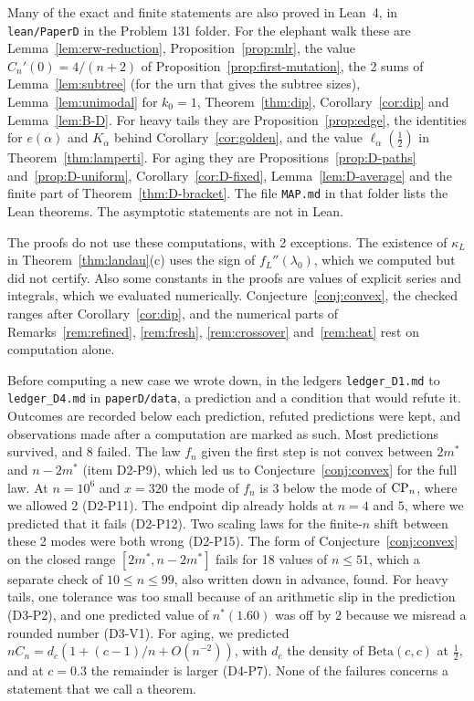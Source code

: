 Many of the exact and finite statements are also proved in Lean~4, in
\texttt{lean/PaperD} in the Problem 131 folder. For the elephant walk
these are Lemma~\ref{lem:erw-reduction}, Proposition~\ref{prop:mlr}, the
value $C_n'(0)=4/(n+2)$ of Proposition~\ref{prop:first-mutation}, the 2
sums of Lemma~\ref{lem:subtree} (for the urn that gives the subtree
sizes), Lemma~\ref{lem:unimodal} for $k_0=1$, Theorem~\ref{thm:dip},
Corollary~\ref{cor:dip} and Lemma~\ref{lem:B-D}. For heavy tails they are
Proposition~\ref{prop:edge}, the identities for $e(\alpha)$ and
$K_\alpha$ behind Corollary~\ref{cor:golden}, and the value
$\ell_\alpha(\frac12)$ in Theorem~\ref{thm:lamperti}. For aging they are
Propositions~\ref{prop:D-paths} and~\ref{prop:D-uniform},
Corollary~\ref{cor:D-fixed}, Lemma~\ref{lem:D-average} and the finite
part of Theorem~\ref{thm:D-bracket}. The file \texttt{MAP.md} in that
folder lists the Lean theorems. The asymptotic statements are not in
Lean.

The proofs do not use these computations, with 2 exceptions. The
existence of $\kappa_L$ in Theorem~\ref{thm:landau}(c) uses the sign of
$f_L''(\lambda_0)$, which we computed but did not certify. Also some
constants in the proofs are values of explicit series and integrals, which
we evaluated numerically. Conjecture~\ref{conj:convex}, the checked ranges
after Corollary~\ref{cor:dip}, and the numerical parts of
Remarks~\ref{rem:refined}, \ref{rem:fresh}, \ref{rem:crossover}
and~\ref{rem:heat} rest on computation alone.

Before computing a new case we wrote down, in the ledgers
\texttt{ledger\_D1.md} to \texttt{ledger\_D4.md} in \texttt{paperD/data},
a prediction and a condition that would refute it. Outcomes are recorded
below each prediction, refuted predictions were kept, and observations
made after a computation are marked as such. Most predictions survived,
and 8 failed. The law $f_n$ given the first step is not convex between
$2m^*$ and $n-2m^*$ (item D2-P9), which led us to
Conjecture~\ref{conj:convex} for the full law. At $n=10^6$ and $x=320$
the mode of $f_n$ is 3 below the mode of $\mathrm{CP}_n$, where we allowed 2
(D2-P11). The endpoint dip already holds at $n=4$ and $5$, where we
predicted that it fails (D2-P12). Two scaling laws for the finite-$n$
shift between these 2 modes were both wrong (D2-P15). The form of
Conjecture~\ref{conj:convex} on the closed range $[2m^*,n-2m^*]$ fails
for 18 values of $n\le51$, which a separate check of $10\le n\le99$, also
written down in advance, found. For heavy tails, one tolerance was too
small because of an arithmetic slip in the prediction (D3-P2), and one
predicted value of $n^*(1.60)$ was off by 2 because we misread a rounded
number (D3-V1). For aging, we predicted $nC_n=d_c(1+(c-1)/n+O(n^{-2}))$,
with $d_c$ the density of $\mathrm{Beta}(c,c)$ at $\frac12$, and at
$c=0.3$ the remainder is larger (D4-P7). None of the failures concerns a
statement that we call a theorem.

